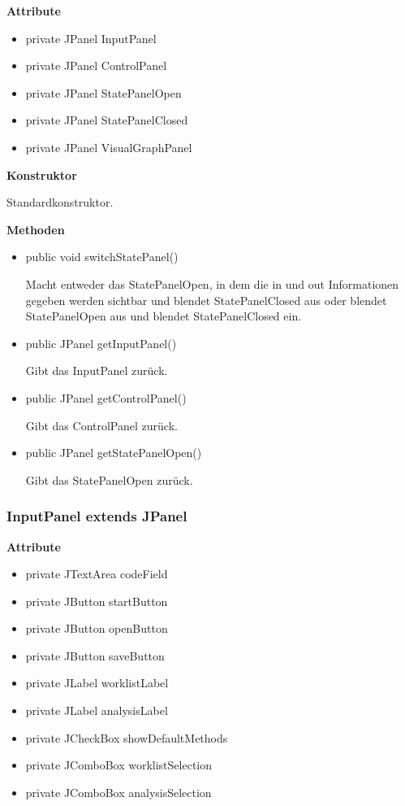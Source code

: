 \textbf{Attribute}
\begin{itemize}
	\item private JPanel InputPanel
	\item private JPanel ControlPanel
	\item private JPanel StatePanelOpen
	\item private JPanel StatePanelClosed
	\item private JPanel VisualGraphPanel
\end{itemize}

\textbf{Konstruktor}\par
Standardkonstruktor.

\textbf{Methoden}
\begin{itemize}
	\item public void switchStatePanel()\par
	Macht entweder das StatePanelOpen, in dem die in und out Informationen gegeben werden sichtbar und blendet StatePanelClosed aus oder blendet StatePanelOpen aus und blendet StatePanelClosed ein. 
	\item public JPanel getInputPanel()\par
	Gibt das InputPanel zurück.
	\item public JPanel getControlPanel()\par
	Gibt das ControlPanel zurück.
	\item public JPanel getStatePanelOpen()\par
	Gibt das StatePanelOpen zurück.
\end{itemize}

\subsubsection{InputPanel extends JPanel}
\textbf{Attribute}
\begin{itemize}
	\item private JTextArea codeField
	\item private JButton startButton
	\item private JButton openButton
	\item private JButton saveButton
	\item private JLabel worklistLabel
	\item private JLabel analysisLabel
	\item private JCheckBox showDefaultMethods
	\item private JComboBox worklistSelection
	\item private JComboBox analysisSelection
\end{itemize}

